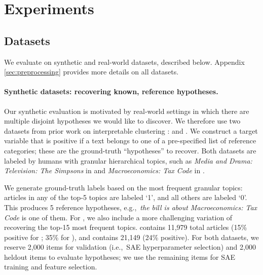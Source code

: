 \section{Experiments}
\label{sec:experiments}



\subsection{Datasets}

We evaluate on synthetic and real-world datasets, described below. Appendix \ref{sec:preprocessing} provides more details on all datasets.

\paragraph{Synthetic datasets: recovering known, reference hypotheses.} 
Our synthetic evaluation is motivated by real-world settings in which there are multiple disjoint hypotheses we would like to discover.
We therefore use two datasets from prior work on interpretable clustering \citep{pham_topicgpt_2024, zhong_explaining_2024}: \textbf{\wiki} and \textbf{\bills}.
We construct a target variable that is positive if a text belongs to one of a pre-specified list of reference categories; these are the ground-truth ``hypotheses'' to recover.
Both datasets are labeled by humans with granular hierarchical topics, such as \textit{Media and Drama: Television: The Simpsons} in \wiki and \textit{Macroeconomics: Tax Code} in \bills. 

We generate ground-truth labels based on the most frequent granular topics: articles in any of the top-5 topics are labeled `1', and all others are labeled `0'.
This produces 5 reference hypotheses, e.g.,~\textit{the bill is about Macroeconomics: Tax Code} is one of them.
For \wiki, we also include a more challenging variation of recovering the top-15 most frequent topics. \wiki contains 11,979 total articles (15\% positive for ; 35\% for ), and \bills contains 21,149 (24\% positive).
For both datasets, we reserve 2,000 items for validation (i.e.,~SAE hyperparameter selection) and 2,000 heldout items to evaluate hypotheses; we use the remaining items for SAE training and feature selection.


